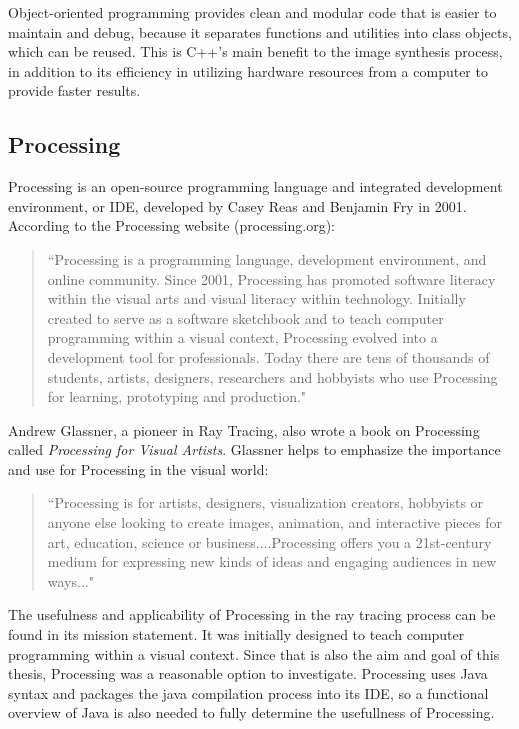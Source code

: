Object-oriented programming provides clean and modular code that is easier to maintain and debug, because it separates functions and utilities into class objects, which can be reused.  This is C++'s main benefit to the image synthesis process, in addition to its efficiency in utilizing hardware resources from a computer to provide faster results.

\subsection{Processing}
\label{sub:Processing}
Processing is an open-source programming language and integrated development environment, or IDE, developed by Casey Reas and Benjamin Fry in 2001. According to the Processing website (processing.org):
\begin{quote}
``Processing is a programming language, development environment, and online community.  Since 2001, Processing has promoted software literacy within the visual arts and visual literacy within technology.  Initially created to serve as a software sketchbook and to teach computer programming within a visual context, Processing evolved into a development tool for professionals.  Today there are tens of thousands of students, artists, designers, researchers and hobbyists who use Processing for learning, prototyping and production."
\end{quote}

Andrew Glassner, a pioneer in Ray Tracing, also wrote a book on Processing called \textit{Processing for Visual Artists}.  Glassner helps to emphasize the importance and use for Processing in the visual world:

\begin{quote}
``Processing is for artists, designers, visualization creators, hobbyists or anyone else looking to create images, animation, and interactive pieces for art, education, science or business....Processing offers you a 21st-century medium for expressing new kinds of ideas and engaging audiences in new ways..."
\end{quote}

The usefulness and applicability of Processing in the ray tracing process can be found in its mission statement. It was initially designed to teach computer programming within a visual context.  Since that is also the aim and goal of this thesis, Processing was a reasonable option to investigate. Processing uses Java syntax and packages the java compilation process into its IDE, so a functional overview of Java is also needed to fully determine the usefullness of Processing.

